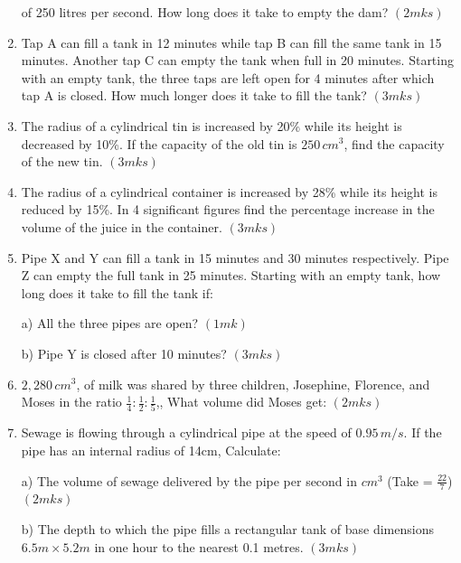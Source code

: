 \documentclass[
  letterpaper,
  DIV=11,
  numbers=noendperiod]{scrreprt}
\begin{document}
\begin{tcolorbox}
\begin{enumerate}
  of 250 litres per second. How long does it take to empty the dam?
  \hspace{12.7 cm} \((2mks)\)
\item
  Tap A can fill a tank in 12 minutes while tap B can fill the same tank
  in 15 minutes. Another tap C can empty the tank when full in 20
  minutes. Starting with an empty tank, the three taps are left open for
  4 minutes after which tap A is closed. How much longer does it take to
  fill the tank? \hspace{13.2 cm} \((3mks)\)
\item
  The radius of a cylindrical tin is increased by 20\% while its height
  is decreased by 10\%. If the capacity of the old tin is \(250\,cm^3\),
  find the capacity of the new tin. \hspace{4cm} \((3mks)\)
\item
  The radius of a cylindrical container is increased by 28\% while its
  height is reduced by 15\%. In 4 significant figures find the
  percentage increase in the volume of the juice in the
  container.\hspace{0cm} \((3mks)\)
\item
  Pipe X and Y can fill a tank in 15 minutes and 30 minutes
  respectively. Pipe Z can empty the full tank in 25 minutes. Starting
  with an empty tank, how long does it take to fill the tank if:

  a) All the three pipes are open? \hspace{8.6 cm} \((1mk)\)

  b) Pipe Y is closed after 10 minutes? \hspace{7.8 cm} \((3mks)\)
\item
  \(2,280 \,cm^3\), of milk was shared by three children, Josephine,
  Florence, and Moses in the ratio
  \(\frac{1}{4}:\frac{1}{2}:\frac{1}{5}\),, What volume did Moses get:
  \hspace{8.2 cm} \((2mks)\)
\item
  Sewage is flowing through a cylindrical pipe at the speed of
  \(0.95\,m/s\). If the pipe has an internal radius of 14cm, Calculate:

  a) The volume of sewage delivered by the pipe per second in \(cm^3\)
  (Take = \(\frac{22}{7}\)) \hspace{1 cm} \((2mks)\)

  b) The depth to which the pipe fills a rectangular tank of base
  dimensions \(6.5m \times 5.2m\) in one hour to the nearest 0.1 metres.
  \hspace{8.5 cm} \((3mks)\)


\end{enumerate}
\end{tcolorbox}
\end{document}
